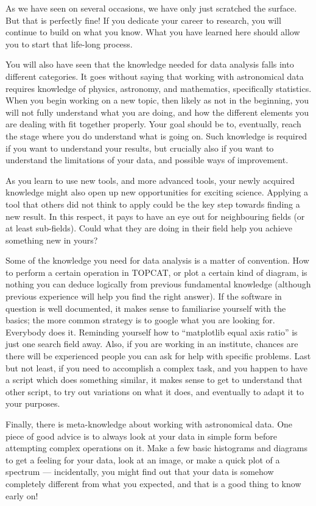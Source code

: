 \documentclass[twocolumn,apj]{openjournal}
\begin{document}
As we have seen on several occasions, we have only just scratched the surface. But that is perfectly fine! If you dedicate your career to research, you will continue to build on what you know. What you have learned here should allow you to start that life-long process.

You will also have seen that the knowledge needed for data analysis falls into different categories. It goes without saying that working with astronomical data requires knowledge of physics, astronomy, and mathematics, specifically statistics. When you begin working on a new topic, then likely as not in the beginning, you will not fully understand what you are doing, and how the different elements you are dealing with fit together properly. Your goal should be to, eventually, reach the stage where you do understand what is going on. Such knowledge is required if you want to understand your results, but crucially also if you want to understand the limitations of your data, and possible ways of improvement. 

As you learn to use new tools, and more advanced tools, your newly acquired knowledge might also open up new opportunities for exciting science. Applying a tool that others did not think to apply could be the key step towards finding a new result. In this respect, it pays to have an eye out for neighbouring fields (or at least sub-fields). Could what they are doing in their field help you achieve something new in yours?

Some of the knowledge you need for data analysis is a matter of convention. How to perform a certain operation in TOPCAT, or plot a certain kind of diagram, is nothing you can deduce logically from previous fundamental knowledge (although previous experience will help you find the right answer). If the software in question is well documented, it makes sense to familiarise yourself with the basics; the more common strategy is to google what you are looking for. Everybody does it. Reminding yourself how to ``matplotlib equal axis ratio'' is just one search field away. Also, if you are working in an institute, chances are there will be experienced people you can ask for help with specific problems. Last but not least, if you need to accomplish a complex task, and you happen to have a script which does something similar, it makes sense to get to understand that other script, to try out variations on what it does, and eventually to adapt it to your purposes.

Finally, there is meta-knowledge about working with astronomical data. One piece of good advice is to always look at your data in simple form before attempting complex operations on it. Make a few basic histograms and diagrams to get a feeling for your data, look at an image, or make a quick plot of a spectrum --- incidentally, you might find out that your data is somehow completely different from what you expected, and that is a good thing to know early on!
\end{document}
